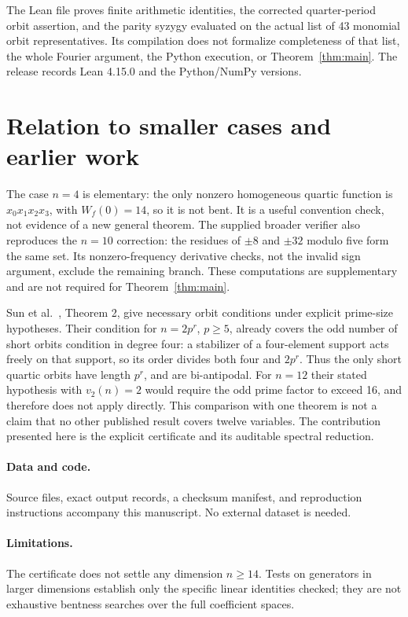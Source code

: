 \documentclass[11pt,a4paper]{article}
\begin{document}
The Lean file proves finite arithmetic identities, the corrected
quarter-period orbit assertion, and the parity syzygy evaluated on
the actual list of 43 monomial orbit representatives. Its compilation
does not formalize completeness of that list, the whole Fourier
argument, the Python execution, or Theorem~\ref{thm:main}.
The release records Lean 4.15.0 and the Python/NumPy versions.

\section{Relation to smaller cases and earlier work}
The case $n=4$ is elementary: the only nonzero homogeneous quartic
function is $x_0x_1x_2x_3$, with $W_f(0)=14$, so it is not bent.
It is a useful convention check, not evidence of a new general theorem.
The supplied broader verifier also reproduces the $n=10$ correction:
the residues of $\pm8$ and $\pm32$ modulo five form the same set.
Its nonzero-frequency derivative checks, not the invalid sign argument,
exclude the remaining branch. These computations are supplementary
and are not required for Theorem~\ref{thm:main}.

Sun et al.~\cite{Sun}, Theorem 2, give necessary orbit conditions under
explicit prime-size hypotheses. Their condition for $n=2p^r$, $p\ge5$,
already covers the odd number of short orbits condition in degree four:
a stabilizer of a four-element support acts freely on that support,
so its order divides both four and $2p^r$. Thus the only short
quartic orbits have length $p^r$, and are bi-antipodal.
For $n=12$ their stated hypothesis with $v_2(n)=2$ would require the
odd prime factor to exceed 16, and therefore does not apply directly.
This comparison with one theorem is not a claim that no other published
result covers twelve variables. The contribution presented here is the
explicit certificate and its auditable spectral reduction.

\paragraph{Data and code.}
Source files, exact output records, a checksum manifest, and reproduction
instructions accompany this manuscript. No external dataset is needed.
\paragraph{Limitations.}
The certificate does not settle any dimension $n\ge14$. Tests on
generators in larger dimensions establish only the specific linear
identities checked; they are not exhaustive bentness searches over
the full coefficient spaces.
\end{document}
